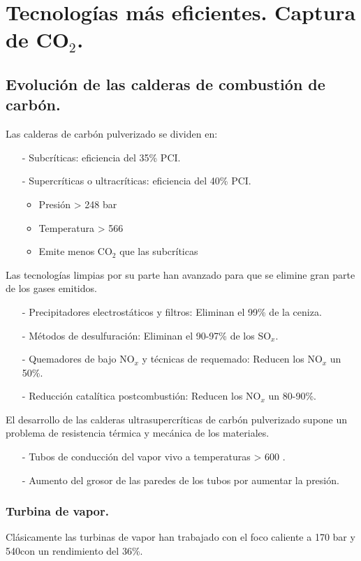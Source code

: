 \chapter{Tecnologías más eficientes. Captura de $\textbf{CO}_2$.}
\section{Evolución de las calderas de combustión de carbón.}
Las calderas de carbón pulverizado se dividen en:
\begin{itemize}
	\item [-] Subcríticas: eficiencia del 35\% PCI.
	\item [-] Supercríticas o ultracríticas: eficiencia del 40\% PCI. 
	\begin{itemize}
		\item Presión > 248 bar
		\item Temperatura > 566\grado
		\item Emite menos CO$_2$ que las subcríticas
	\end{itemize}
\end{itemize}
Las tecnologías limpias por su parte han avanzado para que se elimine gran parte de los gases emitidos.
\begin{itemize}
	\item [-] Precipitadores electrostáticos y filtros: Eliminan el 99\% de la ceniza. 
	\item [-] Métodos de desulfuración: Eliminan el 90-97\% de los SO$_x$.
	\item [-] Quemadores de bajo NO$_x$ y técnicas de requemado: Reducen los NO$_x$ un 50\%.
	\item [-] Reducción catalítica postcombustión: Reducen los NO$_x$ un 80-90\%.
\end{itemize}
El desarrollo de las calderas ultrasupercríticas de carbón pulverizado supone un problema de resistencia térmica y mecánica de los materiales. 
\begin{itemize}
	\item [-] Tubos de conducción del vapor vivo a temperaturas > 600 \grado.
	\item [-] Aumento del grosor de las paredes de los tubos por aumentar la presión.
\end{itemize}
\subsection{Turbina de vapor.}
Clásicamente las turbinas de vapor han trabajado con el foco caliente a 170 bar y 540\grado con un rendimiento del 36\%.


